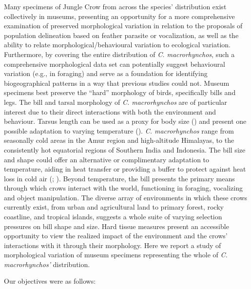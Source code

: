\documentclass[10pt,a4paper]{article}
\begin{document}
Many specimens of Jungle Crow from across the species' distribution exist collectively in museums, presenting an opportunity for a more comprehensive examination of preserved morphological variation in relation to the proposals of population delineation based on feather parasite or vocalization, as well as the ability to relate morphological/behavioural variation to ecological variation.
Furthermore, by covering the entire distribution of \emph{C. macrorhynchos}, such a comprehensive morphological data set can potentially suggest behavioural variation (e.g., in foraging) and serve as a foundation for identifying biogeographical patterns in a way that previous studies could not.
Museum specimens best preserve the ``hard'' morphology of birds, specifically bills and legs.
The bill and tarsal morphology of \emph{C. macrorhynchos} are of particular interest due to their direct interactions with both the environment and behaviour.
Tarsus length can be used as a proxy for body size () and present one possible adaptation to varying temperature ().
\emph{C. macrorhynchos} range from seasonally cold areas in the Amur region and high-altitude Himalayas, to the consistently hot equatorial regions of Southern India and Indonesia.
The bill size and shape could offer an alternative or complimentary adaptation to temperature, aiding in heat transfer or providing a buffer to protect against heat loss in cold air (; ).
Beyond temperature, the bill presents the primary means through which crows interact with the world, functioning in foraging, vocalizing and object manipulation.
The diverse array of environments in which these crows currently exist, from urban and agricultural land to primary forest, rocky coastline, and tropical islands, suggests a whole suite of varying selection pressures on bill shape and size.
Hard tissue measures present an accessible opportunity to view the realized impact of the environment and the crows' interactions with it through their morphology.
Here we report a study of morphological variation of museum specimens representing the whole of \emph{C. macrorhynchos'} distribution.

Our objectives were as follows:
\end{document}
